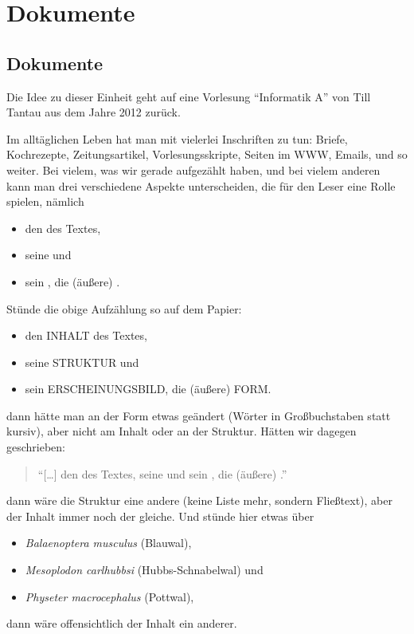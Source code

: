 \chapter{Dokumente}
\label{k:dokumente}
\strictpagecheck
\section{Dokumente}

Die Idee zu dieser Einheit geht auf eine Vorlesung "`Informatik A"' von Till
Tantau aus dem Jahre 2012 zurück.

Im alltäglichen Leben hat man mit vielerlei Inschriften zu tun: Briefe,
Kochrezepte, Zeitungsartikel, Vorlesungsskripte, Seiten im WWW, Emails, und so
weiter.  Bei vielem, was wir gerade aufgezählt haben, und bei vielem anderen
kann man drei verschiedene Aspekte unterscheiden, die für den Leser eine Rolle
spielen, nämlich
%
\begin{itemize}
\item den  des Textes,
\item seine  und
\item sein , die (äußere)
  .
\end{itemize}
%
Stünde die obige Aufzählung so auf dem Papier:
%
\begin{itemize}
\item den \uppercase{Inhalt} des Textes,
\item seine \uppercase{Struktur} und
\item sein \uppercase{Erscheinungsbild}, die (äußere) \uppercase{Form}.
\end{itemize}
%
dann hätte man an der Form etwas geändert (Wörter in Großbuchstaben statt
kursiv), aber nicht am Inhalt oder an der Struktur.  Hätten wir dagegen
geschrieben:
\begin{quote}
  "`[\dots] den  des Textes, seine  und sein
  , die (äußere) ."'
\end{quote}
dann wäre die Struktur eine andere (keine Liste mehr, sondern Fließtext), aber
der Inhalt immer noch der gleiche.  Und stünde hier etwas über
\begin{itemize}
\item \emph{Balaenoptera musculus} (Blauwal),
\item \emph{Mesoplodon carlhubbsi} (Hubbs-Schnabelwal) und
\item \emph{Physeter macrocephalus} (Pottwal),
\end{itemize}
dann wäre offensichtlich der Inhalt ein anderer.


